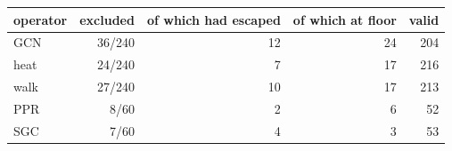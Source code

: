 \begin{tabular}{@{}lrrrr@{}}
\toprule
operator & excluded & of which had escaped & of which at floor & valid \\
\midrule
GCN & 36/240 & 12 & 24 & 204 \\
heat & 24/240 & 7 & 17 & 216 \\
walk & 27/240 & 10 & 17 & 213 \\
\midrule
PPR & 8/60 & 2 & 6 & 52 \\
SGC & 7/60 & 4 & 3 & 53 \\
\bottomrule
\end{tabular}
